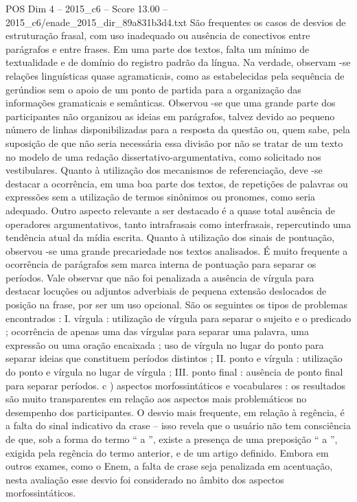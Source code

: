 \begin{textsample}{POS Dim 4 – 2015\_c6 – Score 13.00 – 2015\_c6/enade\_2015\_dir\_89a831b3d4.txt}
São frequentes os casos de desvios de estruturação frasal, com uso inadequado ou ausência de conectivos entre parágrafos e entre frases.
Em uma parte dos textos, falta um mínimo de textualidade e de domínio do registro padrão da língua.
Na verdade, observam -se relações linguísticas quase agramaticais, como as estabelecidas pela sequência de gerúndios sem o apoio de um ponto de partida para a organização das informações gramaticais e semânticas.
Observou -se que uma grande parte dos participantes não organizou as ideias em parágrafos, talvez devido ao pequeno número de linhas disponibilizadas para a resposta da questão ou, quem sabe, pela suposição de que não seria necessária essa divisão por não se tratar de um texto no modelo de uma redação dissertativo-argumentativa, como solicitado nos vestibulares.
Quanto à utilização dos mecanismos de referenciação, deve -se destacar a ocorrência, em uma boa parte dos textos, de repetições de palavras ou expressões sem a utilização de termos sinônimos ou pronomes, como seria adequado.
Outro aspecto relevante a ser destacado é a quase total ausência de operadores argumentativos, tanto intrafrasais como interfrasais, repercutindo uma tendência atual da mídia escrita.
Quanto à utilização dos sinais de pontuação, observou -se uma grande precariedade nos textos analisados.
É muito frequente a ocorrência de parágrafos sem marca interna de pontuação para separar os períodos.
Vale observar que não foi penalizada a ausência de vírgula para destacar locuções ou adjuntos adverbiais de pequena extensão deslocados de posição na frase, por ser um uso opcional.
São os seguintes os tipos de problemas encontrados : I. vírgula : utilização de vírgula para separar o sujeito e o predicado ; ocorrência de apenas uma das vírgulas para separar uma palavra, uma expressão ou uma oração encaixada ; uso de vírgula no lugar do ponto para separar ideias que constituem períodos distintos ; II. ponto e vírgula : utilização do ponto e vírgula no lugar de vírgula ; III. ponto final : ausência de ponto final para separar períodos. c ) aspectos morfossintáticos e vocabulares : os resultados são muito transparentes em relação aos aspectos mais problemáticos no desempenho dos participantes.
O desvio mais frequente, em relação à regência, é a falta do sinal indicativo da crase – isso revela que o usuário não tem consciência de que, sob a forma do termo “ a ”, existe a presença de uma preposição “ a ”, exigida pela regência do termo anterior, e de um artigo definido.
Embora em outros exames, como o Enem, a falta de crase seja penalizada em acentuação, nesta avaliação esse desvio foi considerado no âmbito dos aspectos morfossintáticos.

\end{textsample}
